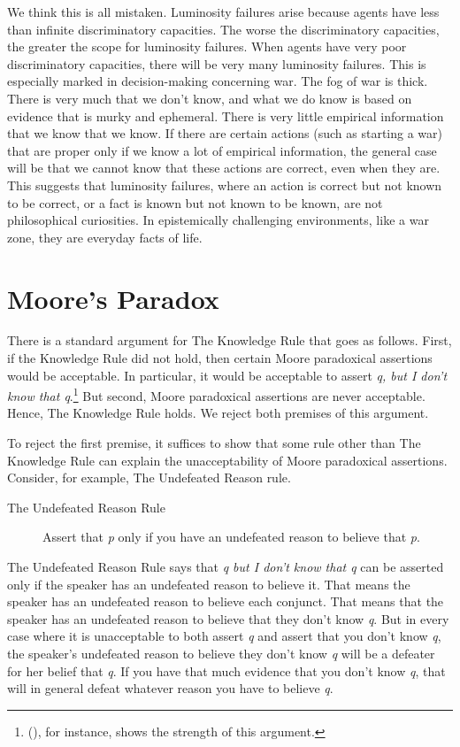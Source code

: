\documentclass[
  10pt,
  letterpaper,
  DIV=11,
  numbers=noendperiod,
  twoside]{scrartcl}
\begin{document}
We think this is all mistaken. Luminosity failures arise because agents
have less than infinite discriminatory capacities. The worse the
discriminatory capacities, the greater the scope for luminosity
failures. When agents have very poor discriminatory capacities, there
will be very many luminosity failures. This is especially marked in
decision-making concerning war. The fog of war is thick. There is very
much that we don't know, and what we do know is based on evidence that
is murky and ephemeral. There is very little empirical information that
we know that we know. If there are certain actions (such as starting a
war) that are proper only if we know a lot of empirical information, the
general case will be that we cannot know that these actions are correct,
even when they are. This suggests that luminosity failures, where an
action is correct but not known to be correct, or a fact is known but
not known to be known, are not philosophical curiosities. In
epistemically challenging environments, like a war zone, they are
everyday facts of life.

\section{Moore's Paradox}\label{moores-paradox}

There is a standard argument for The Knowledge Rule that goes as
follows. First, if the Knowledge Rule did not hold, then certain Moore
paradoxical assertions would be acceptable. In particular, it would be
acceptable to assert \emph{q, but I don't know that q}.\footnote{(), for instance, shows the strength of this argument.} But
second, Moore paradoxical assertions are never acceptable. Hence, The
Knowledge Rule holds. We reject both premises of this argument.

To reject the first premise, it suffices to show that some rule other
than The Knowledge Rule can explain the unacceptability of Moore
paradoxical assertions. Consider, for example, The Undefeated Reason
rule.

\begin{description}
\item[The Undefeated Reason Rule]
Assert that \emph{p} only if you have an undefeated reason to believe
that \emph{p}.
\end{description}

The Undefeated Reason Rule says that \emph{q but I don't know that q}
can be asserted only if the speaker has an undefeated reason to believe
it. That means the speaker has an undefeated reason to believe each
conjunct. That means that the speaker has an undefeated reason to
believe that they don't know \emph{q}. But in every case where it is
unacceptable to both assert \emph{q} and assert that you don't know
\emph{q}, the speaker's undefeated reason to believe they don't know
\emph{q} will be a defeater for her belief that \emph{q}. If you have
that much evidence that you don't know \emph{q}, that will in general
defeat whatever reason you have to believe \emph{q}.
\end{document}

